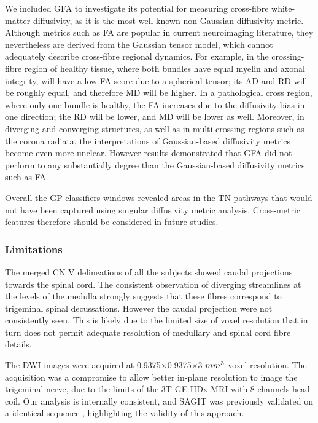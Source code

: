 We included GFA to investigate its potential for measuring cross-fibre white-matter diffusivity, as it is the most well-known non-Gaussian diffusivity metric. Although metrics such as FA are popular in current neuroimaging literature, they nevertheless are derived from the Gaussian tensor model, which cannot adequately describe cross-fibre regional dynamics. For example, in the crossing-fibre region of healthy tissue, where both bundles have equal myelin and axonal integrity, will have a low FA score due to a spherical tensor; its AD and RD will be roughly equal, and therefore MD will be higher. In a pathological cross region, where only one bundle is healthy, the FA increases due to the diffusivity bias in one direction; the RD will be lower, and MD will be lower as well. Moreover, in diverging and converging structures, as well as in multi-crossing regions such as the corona radiata, the interpretations of Gaussian-based diffusivity metrics become even more unclear. However results demonstrated that GFA did not perform to any substantially degree than the Gaussian-based diffusivity metrics such as FA. 

Overall the GP classifiers windows revealed areas in the TN pathways that would not have been captured using singular diffusivity metric analysis. Cross-metric features therefore should be considered in future studies. 

\subsubsection{Limitations}
The merged CN V delineations of all the subjects showed caudal projections towards the spinal cord. The consistent observation of diverging streamlines at the levels of the medulla strongly suggests that these fibres correspond to trigeminal spinal decussations. However the caudal projection were not consistently seen. This is likely due to the limited size of voxel resolution that in turn does not permit adequate resolution of medullary and spinal cord fibre details.

The DWI images were acquired at 0.9375$\times$0.9375$\times$3 $mm\textsuperscript{3}$ voxel resolution. The acquisition was a compromise to allow better in-plane resolution to image the trigeminal nerve, due to the limits of the 3T GE HDx MRI with 8-channels head coil. Our analysis is internally consistent, and SAGIT was previously validated on a identical sequence \cite{Chen2016,Chen2016a}, highlighting the validity of this approach. 

